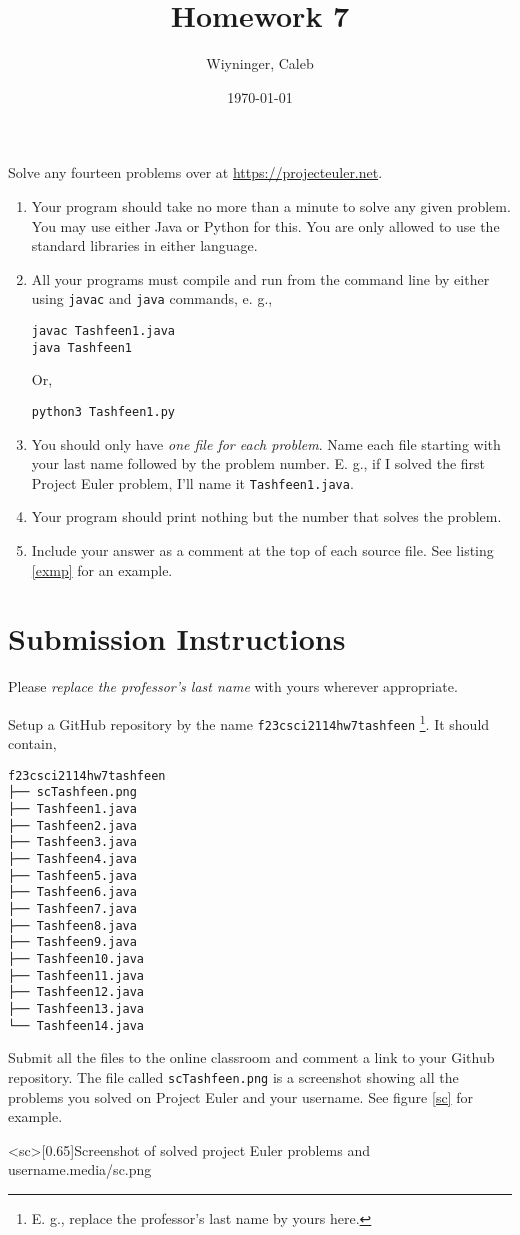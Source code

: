 \documentclass{homework}
\author{Wiyninger, Caleb}
\date{\today}
\title{Homework 7}
\begin{document}
 \maketitle

\question Solve any fourteen problems over at
\url{https://projecteuler.net}.

\begin{enumerate}
  \item Your program should take no more than a minute to solve any given
        problem. You may use either Java or Python for this. You are only
        allowed to use the standard libraries in either language.
  \item All your programs must compile and run from the command line by
        either using \texttt{javac} and \texttt{java} commands, e. g.,
        \begin{verbatim}
javac Tashfeen1.java
java Tashfeen1
\end{verbatim}
        Or,
        \begin{verbatim}
python3 Tashfeen1.py
\end{verbatim}
  \item You should only have \textit{ one file for each problem}. Name
        each file starting with your last name followed by the problem
        number. E. g., if I solved the first Project Euler problem, I'll
        name it \texttt{Tashfeen1.java}.
  \item Your program should print nothing but the number that solves the
        problem.
  \item Include your answer as a comment at the top of each source file.
        See listing \ref{exmp} for an example.
\end{enumerate}

% 

\section{Submission Instructions}

Please \textit{replace the professor's last name} with yours
wherever appropriate.

Setup a GitHub repository by the name
\texttt{f23csci2114hw7tashfeen} \footnote{E. g., replace the
  professor's last name by yours here.}. It should contain,
\begin{verbatim}
f23csci2114hw7tashfeen
├── scTashfeen.png
├── Tashfeen1.java
├── Tashfeen2.java
├── Tashfeen3.java
├── Tashfeen4.java
├── Tashfeen5.java
├── Tashfeen6.java
├── Tashfeen7.java
├── Tashfeen8.java
├── Tashfeen9.java
├── Tashfeen10.java
├── Tashfeen11.java
├── Tashfeen12.java
├── Tashfeen13.java
└── Tashfeen14.java
\end{verbatim}

Submit all the files to the online classroom and comment a link to
your Github repository. The file called \texttt{scTashfeen.png} is a
screenshot showing all the problems you solved on Project Euler and
your username. See figure \ref{sc} for example.

\img<sc>[0.65]{Screenshot of solved project Euler problems and username.}{media/sc.png}
\end{document}

